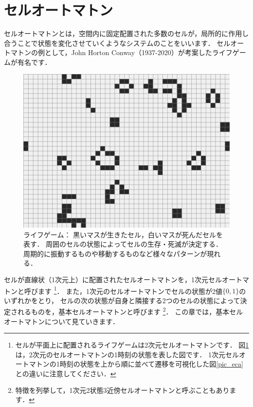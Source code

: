 \documentclass[dvipdfmx]{jsarticle}
\theoremstyle{definition}
\begin{document}
\clearpage


\section{セルオートマトン}  \label{sec_cellular_automaton}
セルオートマトンとは，空間内に固定配置された多数のセルが，局所的に作用し合うことで状態を変化させていくようなシステムのことをいいます．
セルオートマトンの例として，John Horton Conway（1937-2020）が考案したライフゲームが有名です．
%
\begin{figure}[H]
    \centering
    \includegraphics[scale=0.25]{figure/eca/lifegame.png}
    \caption{
        ライフゲーム：
        黒いマスが生きたセル，白いマスが死んだセルを表す．
        周囲のセルの状態によってセルの生存・死滅が決定する．
        周期的に振動するものや移動するものなど様々なパターンが現れる．
    }
    \label{pic_lifegame}
\end{figure}

セルが直線状（1次元上）に配置されたセルオートマトンを，1次元セルオートマトンと呼びます
\footnote{
    セルが平面上に配置されるライフゲームは2次元セルオートマトンです．
    図\ref{pic_lifegame}は，2次元のセルオートマトンの1時刻の状態を表した図です．
    1次元セルオートマトンの1時刻の状態を上から順に並べて遷移を可視化した図\ref{pic_eca}との違いに注意してください．
}．
また，1次元のセルオートマトンでセルの状態が2値$\{0, 1\}$のいずれかをとり，
セルの次の状態が自身と隣接する2つのセルの状態によって決定されるものを，基本セルオートマトンと呼びます
\footnote{
    特徴を列挙して，1次元2状態3近傍セルオートマトンと呼ぶこともあります．
}．
この章では，基本セルオートマトンについて見ていきます．
\end{document}

